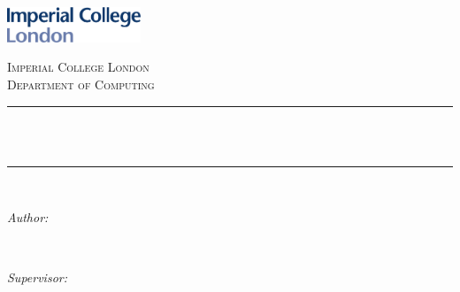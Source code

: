 \begin{titlepage}

\newcommand{\HRule}{\rule{\linewidth}{0.5mm}} %



\includegraphics[width = 4cm]{./figures/imperial}\\[0.5cm] 

\center %


\textsc{\Large Imperial College London}\\[0.5cm] 
\textsc{\large Department of Computing}\\[0.5cm] 


\HRule \\[0.4cm]
{ \huge \bfseries \reporttitle}\\ %
\HRule \\[1.5cm]
 

\begin{minipage}{0.4\textwidth}
\begin{flushleft} \large
\emph{Author:}\\
\reportauthor %
\end{flushleft}
\end{minipage}
~
\begin{minipage}{0.4\textwidth}
\begin{flushright} \large
\emph{Supervisor:} \\
\supervisor %
\end{flushright}
\end{minipage}\\[4cm]



\end{titlepage}
